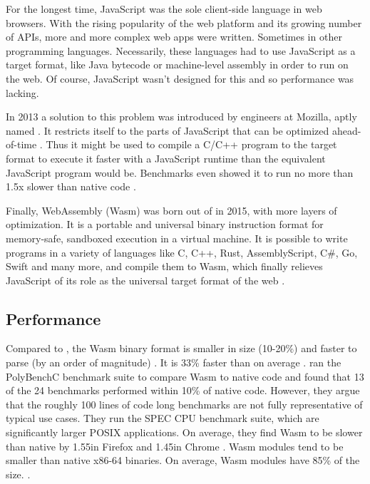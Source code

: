 For the longest time, JavaScript was the sole client-side language in web browsers. With the rising popularity of the web platform and its growing number of APIs, more and more complex web apps were written. Sometimes in other programming languages. Necessarily, these languages had to use JavaScript as a target format, like Java bytecode or machine-level assembly in order to run on the web. Of course, JavaScript wasn't designed for this and so performance was lacking.

In 2013 a solution to this problem was introduced by engineers at Mozilla, aptly named . It restricts itself to the parts of JavaScript that can be optimized ahead-of-time \cite{Herman2014}. Thus it might be used to compile a C/C++ program to the  target format to execute it faster with a JavaScript runtime than the equivalent JavaScript program would be. Benchmarks even showed it to run no more than 1.5x slower than native code \cite{Zakai2013}.

Finally, WebAssembly (Wasm) was born out of  in 2015, with more layers of optimization. It is a portable and universal binary instruction format for memory-safe, sandboxed execution in a virtual machine.
It is possible to write programs in a variety of languages like C, C++, Rust, AssemblyScript, C\#, Go, Swift and many more, and compile them to Wasm, which finally relieves JavaScript of its role as the universal target format of the web \cite{W3C2020}.


\subsection{Performance}

Compared to , the Wasm binary format is smaller in size (10-20\%) and faster to parse (by an order of magnitude)
\cite{Clark2019}. It is 33\% faster than  on average \cite{Haas2017}.
\citeauthor{NotSoFast} ran the PolyBenchC benchmark suite to compare Wasm to native code and found that 13 of the 24 benchmarks performed within 10\% of native code. However, they argue that the roughly 100 lines of code long benchmarks are not fully representative of typical use cases. They run the SPEC CPU benchmark suite, which are significantly larger POSIX applications. On average, they find Wasm to be slower than native by 1.55\times in Firefox and 1.45\times in Chrome \cite{NotSoFast}.
Wasm modules tend to be smaller than native x86-64 binaries. On average, Wasm modules have 85\% of the size.
\cite{Haas2017}.

